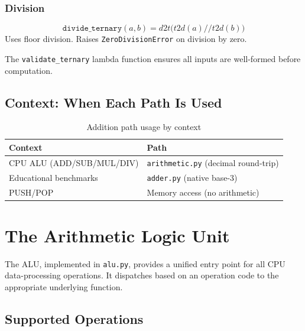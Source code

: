 \documentclass[10pt,a4paper,twoside]{book}
\begin{document}
\subsection*{Division}
\[
\texttt{divide\_ternary}(a,b) = d2t\bigl(t2d(a) \mathbin{//} t2d(b)\bigr)
\]
Uses floor division. Raises \texttt{ZeroDivisionError} on division by zero.

The \texttt{validate\_ternary} lambda function ensures all inputs are well-formed before
computation.

\section{Context: When Each Path Is Used}

\begin{table}[H]
\centering
\caption{Addition path usage by context}
\label{tab:addpaths}
\begin{tabular}{ll}
\toprule
Context & Path \\
\midrule
CPU ALU (ADD/SUB/MUL/DIV) & \texttt{arithmetic.py} (decimal round-trip) \\
Educational benchmarks & \texttt{adder.py} (native base-3) \\
PUSH/POP & Memory access (no arithmetic) \\
\bottomrule
\end{tabular}
\end{table}

\chapter{The Arithmetic Logic Unit}
\label{ch:alu}

The ALU, implemented in \texttt{alu.py}, provides a unified entry point for all
CPU data-processing operations. It dispatches based on an operation code to the
appropriate underlying function.

\section{Supported Operations}
\end{document}
